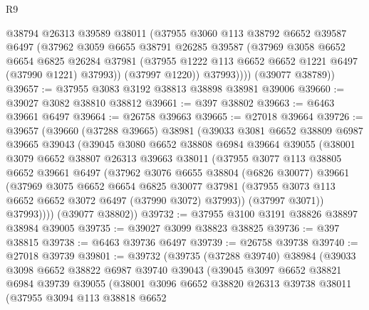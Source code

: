 \begin{lexlean}{R9}
\begin{coremodule}
            @38794
            @26313
            @39589
            @38011
            (@37955
              @3060
              @113
              @38792
              @6652
              @39587
              @6497
              (@37962
                @3059
                @6655
                @38791
                @26285
                @39587
                (@37969
                  @3058
                  @6652
                  @6654
                  @6825
                  @26284
                  @37981
                  (@37955 @1222 @113 @6652 @6652 @1221 @6497 (@37990 @1221) @37993))
                (@37997 @1220))
              @37993))))
      (@39077 @38789))
@39657 := @37955 @3083 @3192 @38813 @38898 @38981 @39006
@39660 := @39027 @3082 @38810 @38812
@39661 := @397 @38802
@39663 := @6463 @39661 @6497
@39664 := @26758 @39663
@39665 := @27018 @39664
@39726 := @39657
    (@39660
      (@37288 @39665)
      @38981
      (@39033
        @3081
        @6652
        @38809
        @6987
        @39665
        @39043
        (@39045
          @3080
          @6652
          @38808
          @6984
          @39664
          @39055
          (@38001
            @3079
            @6652
            @38807
            @26313
            @39663
            @38011
            (@37955
              @3077
              @113
              @38805
              @6652
              @39661
              @6497
              (@37962
                @3076
                @6655
                @38804
                (@6826 @30077)
                @39661
                (@37969
                  @3075
                  @6652
                  @6654
                  @6825
                  @30077
                  @37981
                  (@37955 @3073 @113 @6652 @6652 @3072 @6497 (@37990 @3072) @37993))
                (@37997 @3071))
              @37993))))
      (@39077 @38802))
@39732 := @37955 @3100 @3191 @38826 @38897 @38984 @39005
@39735 := @39027 @3099 @38823 @38825
@39736 := @397 @38815
@39738 := @6463 @39736 @6497
@39739 := @26758 @39738
@39740 := @27018 @39739
@39801 := @39732
    (@39735
      (@37288 @39740)
      @38984
      (@39033
        @3098
        @6652
        @38822
        @6987
        @39740
        @39043
        (@39045
          @3097
          @6652
          @38821
          @6984
          @39739
          @39055
          (@38001
            @3096
            @6652
            @38820
            @26313
            @39738
            @38011
            (@37955
              @3094
              @113
              @38818
              @6652

\end{coremodule}
\end{lexlean}
